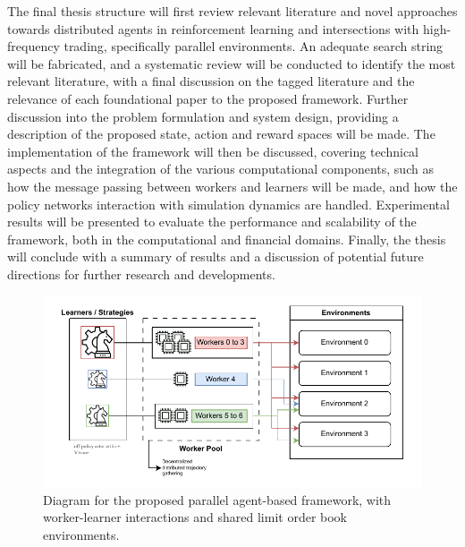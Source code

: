The final thesis structure will first review relevant literature and novel approaches towards distributed agents
in reinforcement learning and intersections with high-frequency trading, specifically parallel environments.
An adequate search string will be fabricated, and a systematic review will be conducted to identify the most relevant literature,
with a final discussion on the tagged literature and the relevance of each foundational paper to the proposed framework.
Further discussion into the problem formulation and system design, providing a description of the proposed state, action and reward spaces will be made.
The implementation of the framework will then be discussed, covering technical aspects and the integration of the various computational components,
such as how the message passing between workers and learners will be made, and how the policy networks interaction with simulation dynamics are handled.
Experimental results will be presented to evaluate the performance and scalability of the framework, both in the computational and financial domains.
Finally, the thesis will conclude with a summary of results and a discussion of potential future directions for further research and developments.

\begin{figure}[H]
    \centering
    \includegraphics[width=\textwidth]{diagram}
    \caption{Diagram for the proposed parallel agent-based framework, with worker-learner interactions and shared limit order book environments.}
    \label{fig:framework}
\end{figure}

